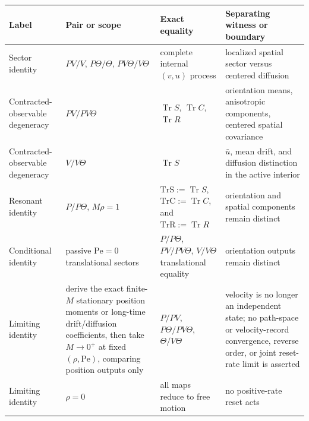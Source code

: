 {\def\LTcaptype{none} %
\begin{longtable}[]{@{}
  >{\raggedright\arraybackslash}p{}
  >{\raggedright\arraybackslash}p{}
  >{\raggedright\arraybackslash}p{}
  >{\raggedright\arraybackslash}p{}@{}}
\toprule\noalign{}
\begin{minipage}[b]{\linewidth}\raggedright
Label
\end{minipage} & \begin{minipage}[b]{\linewidth}\raggedright
Pair or scope
\end{minipage} & \begin{minipage}[b]{\linewidth}\raggedright
Exact equality
\end{minipage} & \begin{minipage}[b]{\linewidth}\raggedright
Separating witness or boundary
\end{minipage} \\
\midrule\noalign{}
\endhead
\bottomrule\noalign{}
\endlastfoot
Sector identity & \(PV/V\), \(P\Theta/\Theta\), \(PV\Theta/V\Theta\) & complete internal \((v,u)\) process & localized spatial sector versus centered diffusion \\
Contracted-observable degeneracy & \(PV/PV\Theta\) & \(\operatorname{Tr}S\), \(\operatorname{Tr}C\), \(\operatorname{Tr}R\) & orientation means, anisotropic components, centered spatial covariance \\
Contracted-observable degeneracy & \(V/V\Theta\) & \(\operatorname{Tr}S\) & \(\bar u\), mean drift, and diffusion distinction in the active interior \\
Resonant identity & \(P/P\Theta\), \(M\rho=1\) & \(\mathrm{TrS}:=\operatorname{Tr}S\), \(\mathrm{TrC}:=\operatorname{Tr}C\), and \(\mathrm{TrR}:=\operatorname{Tr}R\) & orientation and spatial components remain distinct \\
Conditional identity & passive \(\mathrm{Pe}=0\) translational sectors & \(P/P\Theta\), \(PV/PV\Theta\), \(V/V\Theta\) translational equality & orientation outputs remain distinct \\
Limiting identity & derive the exact finite-\(M\) stationary position moments or long-time drift/diffusion coefficients, then take \(M\to0^+\) at fixed \((\rho,\mathrm{Pe})\), comparing position outputs only & \(P/PV\), \(P\Theta/PV\Theta\), \(\Theta/V\Theta\) & velocity is no longer an independent state; no path-space or velocity-record convergence, reverse order, or joint reset-rate limit is asserted \\
Limiting identity & \(\rho=0\) & all maps reduce to free motion & no positive-rate reset acts \\
\end{longtable}
}

